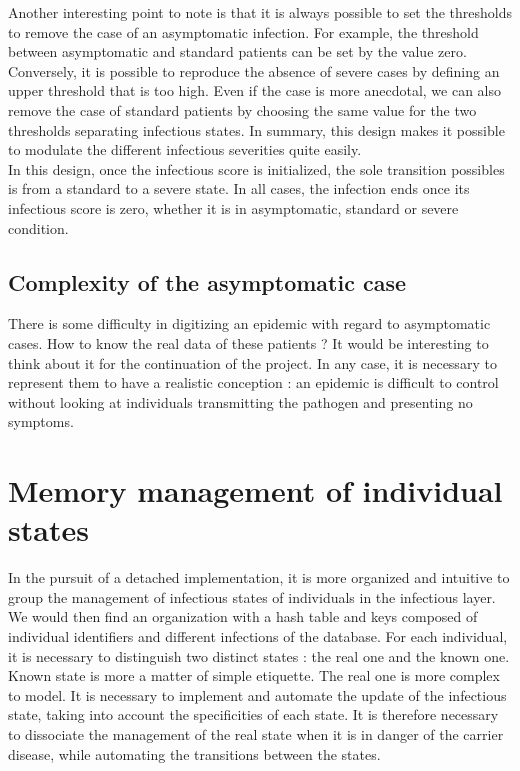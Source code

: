 Another interesting point to note is that it is always possible to set the thresholds to remove the case of an asymptomatic infection. For example, the threshold between asymptomatic and standard patients can be set by the value zero. Conversely, it is possible to reproduce the absence of severe cases by defining an upper threshold that is too high. Even if the case is more anecdotal, we can also remove the case of standard patients by choosing the same value for the two thresholds separating infectious states. In summary, this design makes it possible to modulate the different infectious severities quite easily.\\

In this design, once the infectious score is initialized, the sole transition possibles is from a standard to a severe state. In all cases, the infection ends once its infectious score is zero, whether it is in asymptomatic, standard or severe condition.\\

\subsection{Complexity of the asymptomatic case}

There is some difficulty in digitizing an epidemic with regard to asymptomatic cases. How to know the real data of these patients ? It would be interesting to think about it for the continuation of the project. In any case, it is necessary to represent them to have a realistic conception : an epidemic is difficult to control without looking at individuals transmitting the pathogen and presenting no symptoms.\\

\newpage

\section{Memory management of individual states}

In the pursuit of a detached implementation, it is more organized and intuitive to group the management of infectious states of individuals in the infectious layer. We would then find an organization with a hash table and keys composed of individual identifiers and different infections of the database. For each individual, it is necessary to distinguish two distinct states : the real one and the known one. Known state is more a matter of simple etiquette. The real one is more complex to model. It is necessary to implement and automate the update of the infectious state, taking into account the specificities of each state. It is therefore necessary to dissociate the management of the real state when it is in danger of the carrier disease, while automating the transitions between the states.